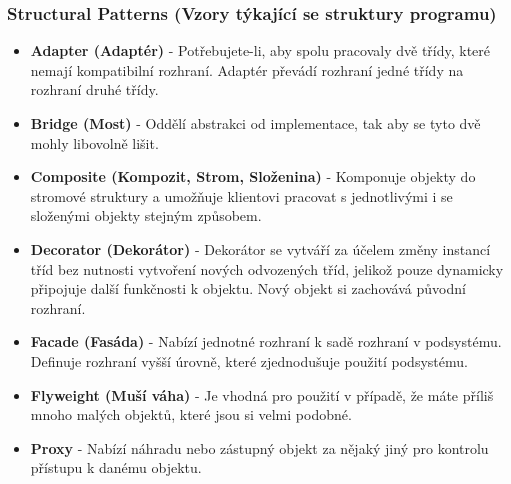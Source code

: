 \subsubsection{Structural Patterns (Vzory týkající se struktury programu)}
\begin{itemize}
	\item \textbf{Adapter (Adaptér)} - Potřebujete-li, aby spolu pracovaly dvě třídy, které nemají kompatibilní rozhraní. Adaptér převádí rozhraní jedné třídy na rozhraní druhé třídy.
	\item \textbf{Bridge (Most)} - Oddělí abstrakci od implementace, tak aby se tyto dvě mohly libovolně lišit.
	\item \textbf{Composite (Kompozit, Strom, Složenina)} - Komponuje objekty do stromové struktury a umožňuje klientovi pracovat s jednotlivými i se složenými objekty stejným způsobem.
	\item \textbf{Decorator (Dekorátor)} - Dekorátor se vytváří za účelem změny instancí tříd bez nutnosti vytvoření nových odvozených tříd, jelikož pouze dynamicky připojuje další funkčnosti k objektu. Nový objekt si zachovává původní rozhraní.
	\item \textbf{Facade (Fasáda)} - Nabízí jednotné rozhraní k sadě rozhraní v podsystému. Definuje rozhraní vyšší úrovně, které zjednodušuje použití podsystému.
	\item \textbf{Flyweight (Muší váha)} - Je vhodná pro použití v případě, že máte příliš mnoho malých objektů, které jsou si velmi podobné.
	\item \textbf{Proxy} - Nabízí náhradu nebo zástupný objekt za nějaký jiný pro kontrolu přístupu k danému objektu.
\end{itemize}

